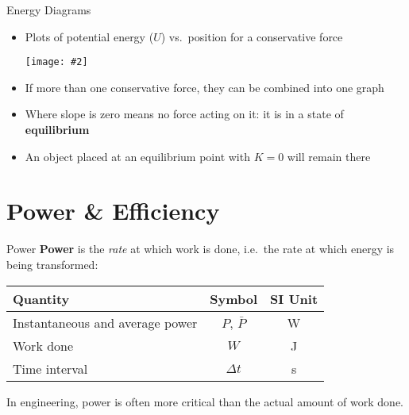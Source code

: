 \documentclass[12pt,compress,aspectratio=169]{beamer}
\newcommand{\pic}[2]{\texttt{[image: \#2]}}
\newcommand{\eq}[2]{\vspace{#1}{\Large\begin{displaymath}#2\end{displaymath}}}
\begin{document}
\begin{frame}{Energy Diagrams}
  \begin{itemize}
  \item Plots of potential energy ($U$) vs.\ position for a conservative force
    \begin{center}
      \pic{.5}{energy-diagram.png}
    \end{center}
  \item If more than one conservative force, they can be combined into one graph
  \item Where slope is zero means no force acting on it: it is in a state of
    \textbf{equilibrium}
  \item An object placed at an equilibrium point with $K=0$ will remain there
  \end{itemize}
\end{frame}


\section{Power \& Efficiency}

\begin{frame}{Power}
  \textbf{Power} is the \emph{rate} at which work is done, i.e.\ the rate at
  which energy is being transformed:

  \eq{-.2in}{
    \boxed{\bar{P} = \frac{W}{\Delta t}}
  }
  \begin{center}
    \begin{tabular}{l|c|c}
      \rowcolor{pink}
      \textbf{Quantity}  & \textbf{Symbol} & \textbf{SI Unit} \\ \hline
      Instantaneous and average power & $P$, $\bar{P}$ & \si{\watt} \\
      Work done          & $W$ & \si{\joule} \\
      Time interval      & $\Delta t$ & \si{\second}
    \end{tabular}
  \end{center}
  In engineering, power is often more critical than the actual amount of work
  done.
\end{frame}
\end{document}
